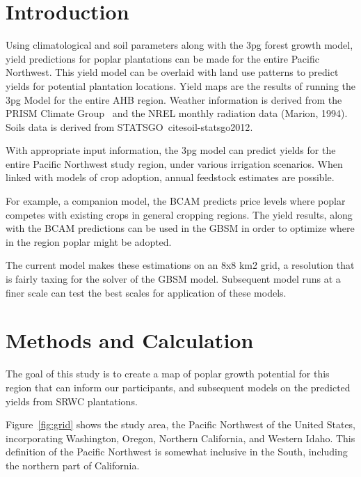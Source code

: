 \documentclass[preprint,12pt]{elsarticle}
\begin{document}

\section{Introduction}
\label{sec:introduction}

Using climatological and soil parameters along with the \ac{3pg} forest
growth model, yield predictions for poplar plantations can be made for
the entire Pacific Northwest.  This yield model can be overlaid with
land use patterns to predict yields for potential plantation
locations.  Yield maps are the results of running the \ac{3pg} Model for
the entire \ac{AHB} region. Weather information is derived from the PRISM
Climate Group~\cite{daly2008} and the \acf{NREL} monthly radiation
data (Marion, 1994). Soils data is derived from
\acf{STATSGO}~cite{soil-statsgo2012}.

With appropriate input information, the \ac{3pg} model can predict
yields for the entire Pacific Northwest study region, under various
irrigation scenarios.  When linked with models of crop adoption,
annual feedstock estimates are possible.

For example, a companion model, the \acf{BCAM} predicts price levels
where poplar competes with existing crops in general cropping regions.
The yield results, along with the \ac{BCAM} predictions can be used in
the \acf{GBSM} in order to optimize where in the region poplar might
be adopted.

The current model makes these estimations on an 8x8 km2 grid, a
resolution that is fairly taxing for the solver of the \ac{GBSM}
model.  Subsequent model runs at a finer scale can test the best
scales for application of these models.

\section{Methods and Calculation}

The goal of this study is to create a map of poplar growth potential
for this region that can inform our participants, and subsequent
models on the predicted yields from \ac{SRWC} plantations.

Figure~\ref{fig:grid} shows the study area, the Pacific Northwest of
the United States, incorporating Washington, Oregon, Northern
California, and Western Idaho.  This definition of the Pacific
Northwest is somewhat inclusive in the South, including the northern
part of California.
\end{document}
